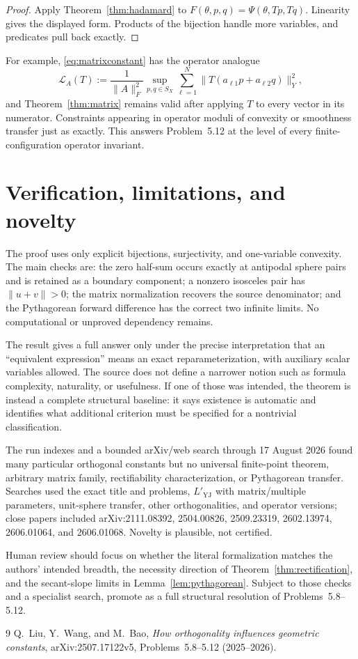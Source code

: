 \documentclass[11pt]{article}
\newcommand{\SX}{S_X}
\newcommand{\Lcal}{\mathcal L}
\begin{document}
\begin{proof}
Apply Theorem~\ref{thm:hadamard} to
$F(\theta,p,q)=\Psi(\theta,Tp,Tq)$.  Linearity gives the displayed form.
Products of the bijection handle more variables, and predicates pull back
exactly.
\end{proof}

For example, \eqref{eq:matrixconstant} has the operator analogue
\[
 \Lcal_A(T):=\frac1{\|A\|_F^2}\sup_{p,q\in\SX}
 \sum_{\ell=1}^N\|T(a_{\ell1}p+a_{\ell2}q)\|_Y^2,
\]
and Theorem~\ref{thm:matrix} remains valid after applying $T$ to every vector
in its numerator.  Constraints appearing in operator moduli of convexity or
smoothness transfer just as exactly.  This answers Problem~5.12 at the level
of every finite-configuration operator invariant.

\section{Verification, limitations, and novelty}

The proof uses only explicit bijections, surjectivity, and one-variable
convexity.  The main checks are: the zero half-sum occurs exactly at antipodal
sphere pairs and is retained as a boundary component; a nonzero isosceles pair
has $\|u+v\|>0$; the matrix normalization recovers the source denominator; and
the Pythagorean forward difference has the correct two infinite limits.  No
computational or unproved dependency remains.

The result gives a full answer only under the precise interpretation that an
``equivalent expression'' means an exact reparameterization, with auxiliary
scalar variables allowed.  The source does not define a narrower notion such
as formula complexity, naturality, or usefulness.  If one of those was
intended, the theorem is instead a complete structural baseline: it says
existence is automatic and identifies what additional criterion must be
specified for a nontrivial classification.

The run indexes and a bounded arXiv/web search through 17 August 2026 found
many particular orthogonal constants but no universal finite-point theorem,
arbitrary matrix family, rectifiability characterization, or Pythagorean
transfer.  Searches used the exact title and problems, $L'_{\mathrm{YJ}}$ with
matrix/multiple parameters, unit-sphere transfer, other orthogonalities, and
operator versions; close papers included arXiv:2111.08392, 2504.00826,
2509.23319, 2602.13974, 2606.01064, and 2606.01068.  Novelty is plausible, not
certified.

Human review should focus on whether the literal formalization matches the
authors' intended breadth, the necessity direction of
Theorem~\ref{thm:rectification}, and the secant-slope limits in
Lemma~\ref{lem:pythagorean}.  Subject to those checks and a specialist search,
promote as a full structural resolution of Problems~5.8--5.12.

\begingroup
\raggedright
\begin{thebibliography}{9}
Q.~Liu, Y.~Wang, and M.~Bao,
\emph{How orthogonality influences geometric constants},
arXiv:2507.17122v5, Problems~5.8--5.12 (2025--2026).
\end{thebibliography}
\endgroup
\end{document}

